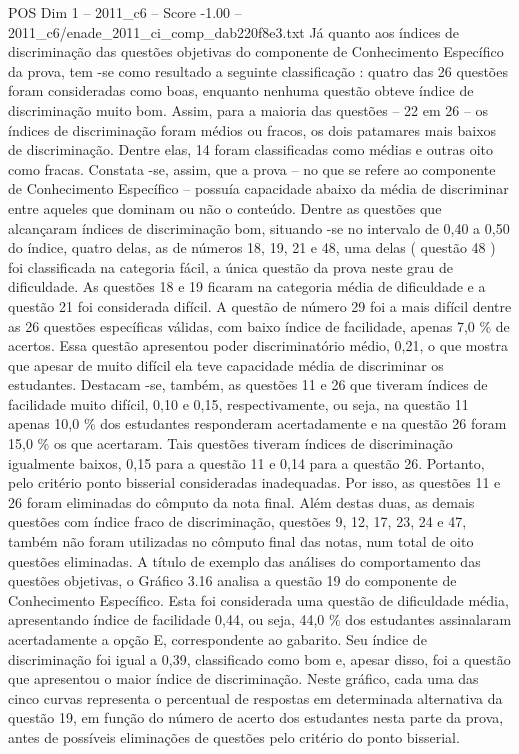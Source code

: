 \begin{textsample}{POS Dim 1 – 2011\_c6 – Score -1.00 – 2011\_c6/enade\_2011\_ci\_comp\_dab220f8e3.txt}
Já quanto aos índices de discriminação das questões objetivas do componente de Conhecimento Específico da prova, tem -se como resultado a seguinte classificação : quatro das 26 questões foram consideradas como boas, enquanto nenhuma questão obteve índice de discriminação muito bom.
Assim, para a maioria das questões – 22 em 26 – os índices de discriminação foram médios ou fracos, os dois patamares mais baixos de discriminação.
Dentre elas, 14 foram classificadas como médias e outras oito como fracas.
Constata -se, assim, que a prova – no que se refere ao componente de Conhecimento Específico – possuía capacidade abaixo da média de discriminar entre aqueles que dominam ou não o conteúdo.
Dentre as questões que alcançaram índices de discriminação bom, situando -se no intervalo de 0,40 a 0,50 do índice, quatro delas, as de números 18, 19, 21 e 48, uma delas ( questão 48 ) foi classificada na categoria fácil, a única questão da prova neste grau de dificuldade.
As questões 18 e 19 ficaram na categoria média de dificuldade e a questão 21 foi considerada difícil.
A questão de número 29 foi a mais difícil dentre as 26 questões específicas válidas, com baixo índice de facilidade, apenas 7,0 \% de acertos.
Essa questão apresentou poder discriminatório médio, 0,21, o que mostra que apesar de muito difícil ela teve capacidade média de discriminar os estudantes.
Destacam -se, também, as questões 11 e 26 que tiveram índices de facilidade muito difícil, 0,10 e 0,15, respectivamente, ou seja, na questão 11 apenas 10,0 \% dos estudantes responderam acertadamente e na questão 26 foram 15,0 \% os que acertaram.
Tais questões tiveram índices de discriminação igualmente baixos, 0,15 para a questão 11 e 0,14 para a questão 26.
Portanto, pelo critério ponto bisserial consideradas inadequadas.
Por isso, as questões 11 e 26 foram eliminadas do cômputo da nota final.
Além destas duas, as demais questões com índice fraco de discriminação, questões 9, 12, 17, 23, 24 e 47, também não foram utilizadas no cômputo final das notas, num total de oito questões eliminadas.
A título de exemplo das análises do comportamento das questões objetivas, o Gráfico 3.16 analisa a questão 19 do componente de Conhecimento Específico.
Esta foi considerada uma questão de dificuldade média, apresentando índice de facilidade 0,44, ou seja, 44,0 \% dos estudantes assinalaram acertadamente a opção E, correspondente ao gabarito.
Seu índice de discriminação foi igual a 0,39, classificado como bom e, apesar disso, foi a questão que apresentou o maior índice de discriminação.
Neste gráfico, cada uma das cinco curvas representa o percentual de respostas em determinada alternativa da questão 19, em função do número de acerto dos estudantes nesta parte da prova, antes de possíveis eliminações de questões pelo critério do ponto bisserial.

\end{textsample}
